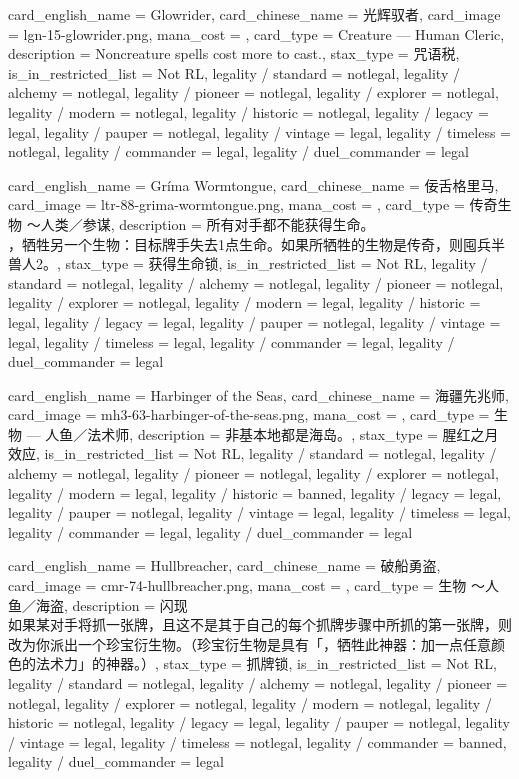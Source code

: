 \documentclass[lang = cn, color = black, 10pt]{AllThatStax}
\begin{document}
\card
{
	card_english_name = {Glowrider},
	card_chinese_name = {光辉驭者},
	card_image = lgn-15-glowrider.png,
	mana_cost = ,
	card_type = Creature — Human Cleric,
	description = {Noncreature spells cost  more to cast.},
	stax_type = 咒语税,
	is_in_restricted_list = Not RL,
	legality / standard = notlegal,
	legality / alchemy = notlegal,
	legality / pioneer = notlegal,
	legality / explorer = notlegal,
	legality / modern = notlegal,
	legality / historic = notlegal,
	legality / legacy = legal,
	legality / pauper = notlegal,
	legality / vintage = legal,
	legality / timeless = notlegal,
	legality / commander = legal,
	legality / duel_commander = legal
}

\card
{
	card_english_name = {Gríma Wormtongue},
	card_chinese_name = {佞舌格里马},
	card_image = ltr-88-grima-wormtongue.png,
	mana_cost = ,
	card_type = 传奇生物 ～人类／参谋,
	description = {所有对手都不能获得生命。\\
		，牺牲另一个生物：目标牌手失去1点生命。如果所牺牲的生物是传奇，则囤兵半兽人2。},
	stax_type = 获得生命锁,
	is_in_restricted_list = Not RL,
	legality / standard = notlegal,
	legality / alchemy = notlegal,
	legality / pioneer = notlegal,
	legality / explorer = notlegal,
	legality / modern = legal,
	legality / historic = legal,
	legality / legacy = legal,
	legality / pauper = notlegal,
	legality / vintage = legal,
	legality / timeless = legal,
	legality / commander = legal,
	legality / duel_commander = legal
}

\card
{
	card_english_name = {Harbinger of the Seas},
	card_chinese_name = {海疆先兆师},
	card_image = mh3-63-harbinger-of-the-seas.png,
	mana_cost = ,
	card_type = 生物 — 人鱼／法术师,
	description = {非基本地都是海岛。},
	stax_type = 腥红之月效应,
	is_in_restricted_list = Not RL,
	legality / standard = notlegal,
	legality / alchemy = notlegal,
	legality / pioneer = notlegal,
	legality / explorer = notlegal,
	legality / modern = legal,
	legality / historic = banned,
	legality / legacy = legal,
	legality / pauper = notlegal,
	legality / vintage = legal,
	legality / timeless = legal,
	legality / commander = legal,
	legality / duel_commander = legal
}

\card
{
	card_english_name = {Hullbreacher},
	card_chinese_name = {破船勇盗},
	card_image = cmr-74-hullbreacher.png,
	mana_cost = ,
	card_type = 生物 ～人鱼／海盗,
	description = {闪现\\
		如果某对手将抓一张牌，且这不是其于自己的每个抓牌步骤中所抓的第一张牌，则改为你派出一个珍宝衍生物。（珍宝衍生物是具有「，牺牲此神器：加一点任意颜色的法术力」的神器。）},
	stax_type = 抓牌锁,
	is_in_restricted_list = Not RL,
	legality / standard = notlegal,
	legality / alchemy = notlegal,
	legality / pioneer = notlegal,
	legality / explorer = notlegal,
	legality / modern = notlegal,
	legality / historic = notlegal,
	legality / legacy = legal,
	legality / pauper = notlegal,
	legality / vintage = legal,
	legality / timeless = notlegal,
	legality / commander = banned,
	legality / duel_commander = legal
}
\end{document}
